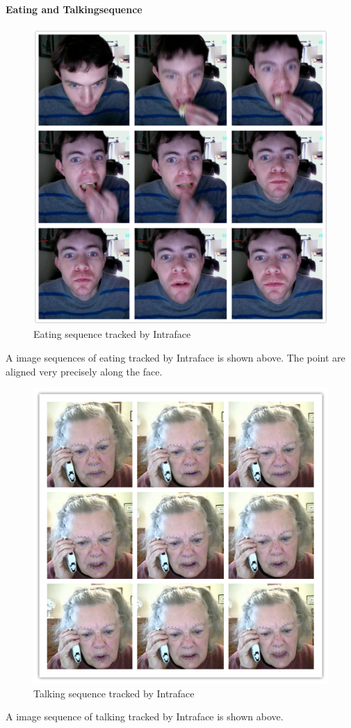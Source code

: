 \paragraph{Eating and Talkingsequence}
\begin{figure}[h!]
\centering
\includegraphics[width=130mm]{imgs/Tracking_Intraface_eating_red.png}
\caption{Eating sequence tracked by Intraface}
\end{figure}
A image sequences of eating tracked by Intraface is shown above. The point are aligned very precisely along the face.
\begin{figure}[h!]
\centering
\includegraphics[width=130mm]{imgs/Talking_Intraface_140711_176_184.png}
\caption{Talking sequence tracked by Intraface}
\end{figure}
A image sequence of talking tracked by Intraface is shown above.
